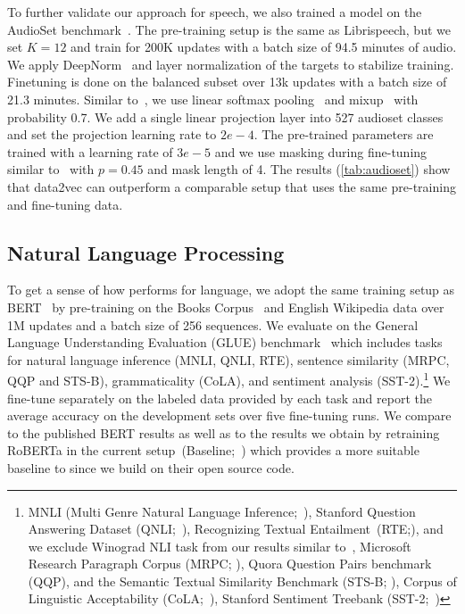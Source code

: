 \documentclass[nohyperref]{article}
\theoremstyle{plain}
\theoremstyle{definition}
\theoremstyle{remark}
\begin{document}
\insertAStable

To further validate our approach for speech, we also trained a model on the AudioSet benchmark~\citep{gemmeke2017audioset}. 
The pre-training setup is the same as Librispeech, but we set $K=12$ and train for 200K updates with a batch size of 94.5 minutes of audio. 
We apply DeepNorm~\citep{wang2022deepnorm} and layer normalization of the targets to stabilize training. 
Finetuning is done on the balanced subset over 13k updates with a batch size of 21.3 minutes. 
Similar to~\citet{srivistava2021nonspeech}, we use linear softmax pooling~\citep{wang2018linsoftmax} and mixup~\citep{tokozume2017mixup} with probability 0.7. 
We add a single linear projection layer into 527 audioset classes and set the projection learning rate to $2e-4$. 
The pre-trained parameters are trained with a learning rate of $3e-5$ and we use masking during fine-tuning similar to~\citet{baevski2020wav} with $p=0.45$ and mask length of 4. 
The results (\autoref{tab:audioset}) show that data2vec can outperform a comparable setup that uses the same pre-training and fine-tuning data.


\subsection{Natural Language Processing}
\label{sec:results_nlp}

\insertGLUEtable

To get a sense of how \name{} performs for language, we adopt the same training setup as BERT~\citep{devlin2018bert} by pre-training on the Books Corpus~\citep{zhu2015books} and English Wikipedia data over 1M updates and a batch size of 256 sequences.
We evaluate on the General Language Understanding Evaluation (GLUE) benchmark~\citep{wang2018glue} which includes tasks for natural language inference (MNLI, QNLI, RTE), sentence similarity (MRPC, QQP and STS-B), grammaticality (CoLA), and sentiment analysis (SST-2).\footnote{MNLI (Multi Genre Natural Language Inference;~\citealt{williams2017mnli}), Stanford Question Answering Dataset (QNLI;~\citealt{rajpurkar2016squad}), Recognizing Textual Entailment~(RTE;\citealt{dagan2006rte1,haim2006rte2,giampiccolo2007rte3,bentivogli2009rte}), and we exclude Winograd NLI task from our results similar to~\citet{devlin2018bert},
Microsoft Research Paragraph Corpus (MRPC; \citealt{dolan2005mrpc}), Quora Question Pairs benchmark (QQP), and the Semantic Textual Similarity Benchmark (STS-B; \citealt{cer2017stsb}),
Corpus of Linguistic Acceptability (CoLA;~\citealt{warstadt2018cola}),
Stanford Sentiment Treebank (SST-2;~\citealt{socher2013sst2})}
We fine-tune \name{} separately on the labeled data provided by each task and report the average accuracy on the development sets over five fine-tuning runs.
We compare to the published BERT results as well as to the results we obtain by retraining RoBERTa in the current setup~(Baseline;~\citealt{liu2019roberta}) which provides a more suitable baseline to \name{} since we build on their open source code.
\end{document}
